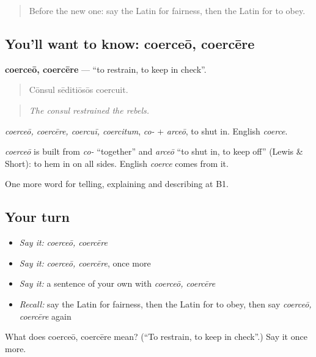 \begin{quote}
Before the new one: say the Latin for fairness, then the Latin for to obey.
\end{quote}

\subsection*{You'll want to know: coerceō, coercēre}
\textbf{coerceō, coercēre} — \textquotedblleft{}to restrain, to keep in check\textquotedblright{}.

\begin{quote}
Cōnsul sēditiōsōs coercuit.
\end{quote}

\begin{quote}
\emph{The consul restrained the rebels.}
\end{quote}

\emph{coerceō, coercēre, coercuī, coercitum}, \emph{co-} + \emph{arceō}, to shut in. English \emph{coerce}.

\begin{cousinweb}
\emph{coerceō} is built from \emph{co-} \textquotedblleft{}together\textquotedblright{} and \emph{arceō} \textquotedblleft{}to shut in, to keep off\textquotedblright{} (Lewis \& Short): to hem in on all sides. English \emph{coerce} comes from it.
\end{cousinweb}

\begin{grammarlens}[title={What you've built}]
One more word for telling, explaining and describing at B1.
\end{grammarlens}

\subsection*{Your turn}
\begin{itemize}
\raggedright
  \item \emph{Say it:} \emph{coerceō, coercēre}
  \item \emph{Say it:} \emph{coerceō, coercēre}, once more
  \item \emph{Say it:} a sentence of your own with \emph{coerceō, coercēre}
  \item \emph{Recall:} say the Latin for fairness, then the Latin for to obey, then say \emph{coerceō, coercēre} again
\end{itemize}

\begin{tcolorbox}[breakable,colback=teal!4,colframe=teal!35!black,title={Before you move on}]
What does coerceō, coercēre mean? (\textquotedblleft{}To restrain, to keep in check\textquotedblright{}.) Say it once more.
\end{tcolorbox}
